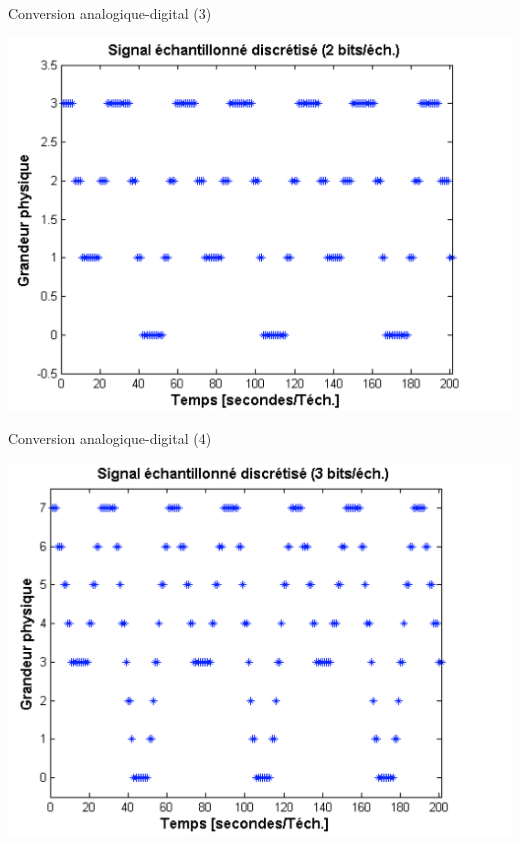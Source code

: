 \begin{frame}{Conversion analogique-digital (3)}

\begin{center}
\includegraphics[width=.8\textwidth]{images/ad_2.png}
\end{center}

\end{frame}

\begin{frame}{Conversion analogique-digital (4)}

\begin{center}
\includegraphics[width=.8\textwidth]{images/ad_3.png}
\end{center}

\end{frame}

